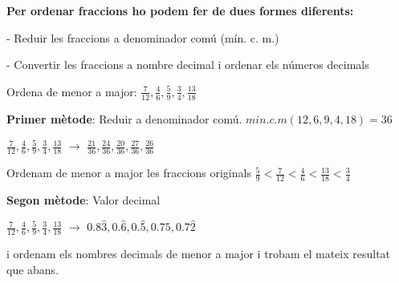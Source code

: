 \begin{theorybox}

\textbf{Per ordenar fraccions ho podem fer de dues formes diferents:}

- Reduir les fraccions a denominador comú (mín. c. m.)

- Convertir les fraccions a nombre decimal i ordenar els números decimals
\vspace{0.25cm}
\end{theorybox}

\begin{mylist}
	 

 
	\exer  Ordena de menor a major: $\frac{7}{12},\frac{4}{6},\frac{5}{9},\frac{3}{4},\frac{13}{18}$

\end{mylist}	

	\begin{example}[*]
		\textbf{Primer mètode}: Reduir a denominador comú.
				$min.c.m(12, 6, 9, 4, 18) = 36$
		
		$\frac{7}{12},\frac{4}{6},\frac{5}{9},\frac{3}{4},\frac{13}{18}$  \quad $\rightarrow$ \quad $\frac{21}{36},\frac{24}{36},\frac{20}{36},\frac{27}{36},\frac{26}{36}$
		
		Ordenam de menor a major les fraccions originals $\frac{5}{9} < \frac{7}{12} < \frac{4}{6} < \frac{13}{18} < \frac{3}{4}$
		
		\textbf{Segon mètode}: Valor decimal
		
		$\frac{7}{12},\frac{4}{6},\frac{5}{9},\frac{3}{4},\frac{13}{18}$  \quad $\rightarrow$ \quad $0.8\hat{3}, 0.\hat{6}, 0.\hat{5}, 0.75, 0.7\hat{2}$
		
		i ordenam els nombres decimals de menor a major i trobam el mateix resultat que abans.
		
	\end{example}
 


